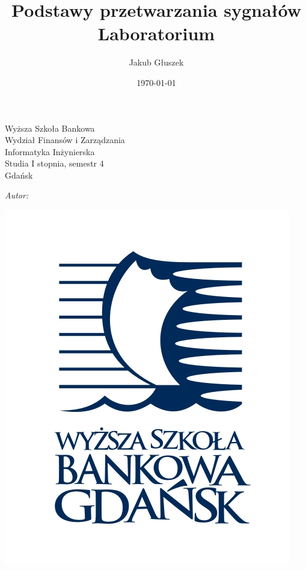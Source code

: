 \author{
	Jakub Głuszek\\
}
\title{Podstawy przetwarzania sygnałów\\Laboratorium}
\date{\today}


\makeatletter
\newcommand{\linia}{\rule{\linewidth}{0.4mm}}
\renewcommand{\maketitle}{\begin{titlepage}
		\vspace*{1cm}
		\begin{center}\large
			Wyższa Szkoła Bankowa\\
			Wydział Finansów i Zarządzania\\
			Informatyka Inżynierska\\
			Studia I stopnia, semestr 4\\
			Gdańsk
		\end{center}
		\vspace{3cm}
		\noindent
		\begin{center}
			\Huge \textbf{\textsc{\@title}}
		\end{center}
		\vspace{0.5cm}
		\begin{center}
			\Large \version
		\end{center}		
		\vspace{1cm}
		\begin{flushright}
			\begin{minipage}{5cm}
				\textit{\small Autor:}\\
				\normalsize \textsc{\@author} \par
			\end{minipage}
			\vspace{1cm}
		\end{flushright}
		
		\begin{center}
			\includegraphics[width=.4\linewidth]{images/logo}
		\end{center}
		
		\vspace*{\stretch{6}}
		\begin{center}
			\Large\@date
		\end{center}
	\end{titlepage}%
}

\begin{titlepage}
	\maketitle
\end{titlepage}